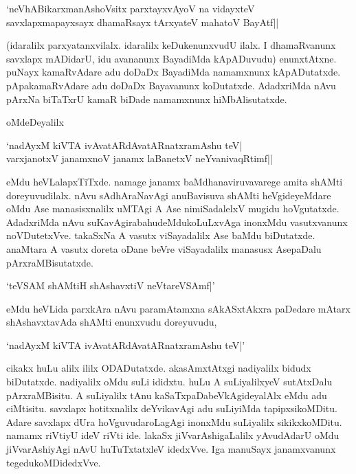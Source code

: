 \begin{shloka}
`neVhABikarxmanAshoVsitx parxtayxvAyoV na vidayxteV\\
savxlapxmapayxsayx dhamaRsayx tArxyateV mahatoV BayAtf||
\end{shloka}

(idaralilx parxyatanxvilalx. idaralilx keDukenunxvudU ilalx. I dhamaRvanunx savxlapx mADidarU, idu avananunx BayadiMda kApADuvudu) enunxtAtxne. puNayx kamaRvAdare adu doDaDx BayadiMda namamxnunx kApADutatxde. pApakamaRvAdare adu doDaDx Bayavanunx koDutatxde. AdadxriMda nAvu pArxNa biTaTxrU kamaR biDade namamxnunx hiMbAlisutatxde.

oMdeDeyalilx

\begin{shloka}
`nadAyxM kiVTA ivAvatARdAvatARnatxramAshu teV|\\
varxjanotxV janamxnoV janamx laBanetxV neYvanivaqRtimf||
\end{shloka}

eMdu heVLalapxTiTxde. namage janamx baMdhanaviruvavarege amita shAMti doreyuvudilalx. nAvu sAdhAraNavAgi anuBavisuva shAMti heVgideyeMdare oMdu Ase manasisxnalilx uMTAgi A Ase nimiSadalelxV mugidu hoVgutatxde. AdadxriMda nAvu suKavAgirabahudeMdukoLuLxvAga inonxMdu vasutxvanunx noVDutetxVve. takaSxNa A vasutx viSayadalilx Ase baMdu biDutatxde. anaMtara A vasutx doreta oDane beVre viSayadalilx manasusx AsepaDalu pArxraMBisutatxde.

\begin{shloka}
`teVSAM shAMtiH shAshavxtiV neVtareVSAmf|'
\end{shloka}

eMdu heVLida parxkAra nAvu paramAtamxna sAkASxtAkxra paDedare mAtarx shAshavxtavAda shAMti enunxvudu doreyuvudu,

\begin{shloka}
`nadAyxM kiVTA ivAvatARdAvatARnatxramAshu teV|'
\end{shloka}

cikakx huLu alilx ililx ODADutatxde. akasAmxtAtxgi nadiyalilx bidudx biDutatxde. nadiyalilx oMdu suLi ididxtu. huLu A suLiyalilxyeV sutAtxDalu pArxraMBisitu. A suLiyalilx tAnu kaSaTxpaDabeVkAgideyalAlx eMdu adu ciMtisitu. savxlapx hotitxnalilx deYvikavAgi adu suLiyiMda tapipxsikoMDitu. Adare savxlapx dUra hoVguvudaroLagAgi inonxMdu suLiyalilx sikikxkoMDitu. namamx riVtiyU ideV riVti ide. {}lakaSx jiVvarAshigaLalilx yAvudAdarU oMdu jiVvarAshiyAgi nAvU huTuTxtatxleV idedxVve. Iga manuSayx janamxvanunx tegedukoMDidedxVve.

